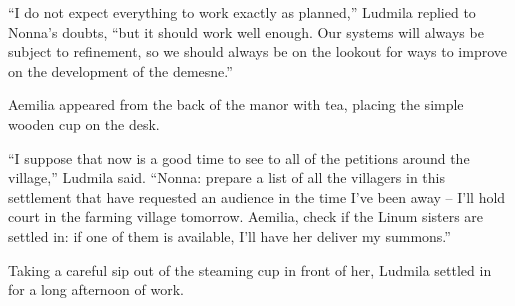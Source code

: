  

“I do not expect everything to work exactly as planned,” Ludmila replied to Nonna’s doubts, “but it should work well enough. Our systems will always be subject to refinement, so we should always be on the lookout for ways to improve on the development of the demesne.”

 

Aemilia appeared from the back of the manor with tea, placing the simple wooden cup on the desk.

 

“I suppose that now is a good time to see to all of the petitions around the village,” Ludmila said. “Nonna: prepare a list of all the villagers in this settlement that have requested an audience in the time I’ve been away – I’ll hold court in the farming village tomorrow. Aemilia, check if the Linum sisters are settled in: if one of them is available, I’ll have her deliver my summons.”

 

Taking a careful sip out of the steaming cup in front of her, Ludmila settled in for a long afternoon of work.
